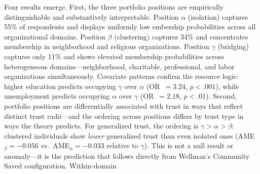Four results emerge. First, the three portfolio positions are empirically distinguishable and substantively interpretable. Position $\alpha$ (isolation) captures 55\% of respondents and displays uniformly low embership probabilities across all organizational domains. Position $\beta$ (clustering) captures 34\% and concentrates membership in neighborhood and religious organizations. Position $\gamma$ (bridging) captures only 11\% and shows elevated membership probabilities across heterogeneous domains---neighborhood, charitable, professional, and labor organizations simultaneously. Covariate patterns confirm the resource logic: higher education predicts occupying $\gamma$ over $\alpha$ (OR~$= 3.24$, $p < .001$), while unemployment predicts occupying $\alpha$ over $\gamma$ (OR~$= 2.18$, $p < .01$). Second, portfolio positions are differentially associated with trust in ways that reflect distinct trust radii---and the ordering across positions differs by trust type in ways the theory predicts. For generalized trust, the ordering is $\gamma > \alpha > \beta$: clustered individuals show \textit{lower} generalized trust than even isolated ones (AME$_\beta = -0.056$ vs.\ AME$_\alpha = -0.033$ relative to $\gamma$). This is not a null result or anomaly---it is the prediction that follows directly from Wellman's Community Saved configuration. Within-domain
